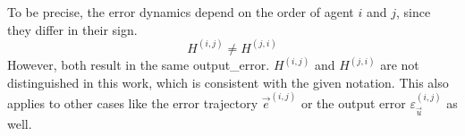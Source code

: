 \begin{notebox}
	To be precise, the error dynamics depend on the order of agent $i$ and $j$, 
	since they differ in their sign.
		\begin{equation}
			H^{(i,j)}\neq H^{(j,i)}
		\end{equation}			
		However, both result in the same \gls*{output_error}. 
		$H^{(i,j)}$ and $H^{(j,i)}$ are not distinguished in this work, 
		which is consistent with the given notation. This also applies to other cases like the error trajectory $\vec{e}^{(i,j)}$ or the output error $\varepsilon^{(i,j)}_{\vec{u}}$ as well.
\end{notebox}

\pagebreak
\renewcommand{\arraystretch}{1.3}
